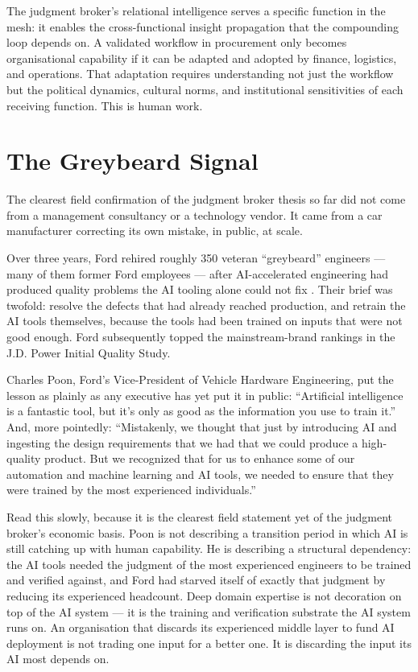 The judgment broker's relational intelligence serves a specific function in the mesh: it enables the cross-functional insight propagation that the compounding loop depends on. A validated workflow in procurement only becomes organisational capability if it can be adapted and adopted by finance, logistics, and operations. That adaptation requires understanding not just the workflow but the political dynamics, cultural norms, and institutional sensitivities of each receiving function. This is human work.

\section{The Greybeard Signal}

The clearest field confirmation of the judgment broker thesis so far did not come from a management consultancy or a technology vendor. It came from a car manufacturer correcting its own mistake, in public, at scale.

Over three years, Ford rehired roughly 350 veteran ``greybeard'' engineers --- many of them former Ford employees --- after AI-accelerated engineering had produced quality problems the AI tooling alone could not fix \parencite{Bloomberg2026Ford}. Their brief was twofold: resolve the defects that had already reached production, and retrain the AI tools themselves, because the tools had been trained on inputs that were not good enough. Ford subsequently topped the mainstream-brand rankings in the J.D. Power Initial Quality Study.

Charles Poon, Ford's Vice-President of Vehicle Hardware Engineering, put the lesson as plainly as any executive has yet put it in public: ``Artificial intelligence is a fantastic tool, but it's only as good as the information you use to train it.'' And, more pointedly: ``Mistakenly, we thought that just by introducing AI and ingesting the design requirements that we had that we could produce a high-quality product. But we recognized that for us to enhance some of our automation and machine learning and AI tools, we needed to ensure that they were trained by the most experienced individuals.''

Read this slowly, because it is the clearest field statement yet of the judgment broker's economic basis. Poon is not describing a transition period in which AI is still catching up with human capability. He is describing a structural dependency: the AI tools needed the judgment of the most experienced engineers to be trained and verified against, and Ford had starved itself of exactly that judgment by reducing its experienced headcount. Deep domain expertise is not decoration on top of the AI system --- it is the training and verification substrate the AI system runs on. An organisation that discards its experienced middle layer to fund AI deployment is not trading one input for a better one. It is discarding the input its AI most depends on.

